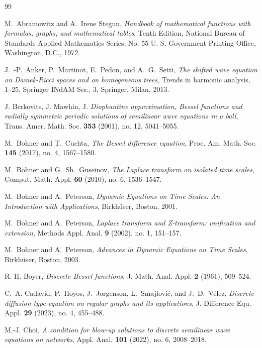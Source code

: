 \documentclass[12pt]{amsart}
\numberwithin{equation}{section}
\begin{document}
\begin{thebibliography}{99}

 M.~Abramowitz and A.~Irene Stegun, \emph{Handbook of
mathematical functions with formulas, graphs, and mathematical tables},
Tenth Edition, National Bureau of Standards Applied Mathematics Series, No.
55 U. S. Government Printing Office, Washington, D.C., 1972.

 J.~-P.~Anker, P.~Martinot, E.~Pedon, and A.~G.~Setti, \emph{%
The shifted wave equation on Damek-Ricci spaces and on homogeneous trees},
Trends in harmonic analysis, 1--25, Springer INdAM Ser., 3, Springer, Milan,
2013.

 J. Berkovits, J. Mawhin, J. \emph{Diophantine approximation, Bessel functions and radially symmetric periodic solutions of semilinear wave equations in a ball}, Trans. Amer. Math. Soc. \textbf{353} (2001), no. 12, 5041--5055.

 M.~Bohner and T.~Cuchta, \emph{The Bessel difference equation},
Proc. Am. Math. Soc. \textbf{145} (2017), no. 4, 1567--1580.


 M.~Bohner and G.~Sh.~Guseinov, \emph{The Laplace transform on
isolated time scales}, Comput. Math. Appl. \textbf{60} (2010), no. 6,
1536--1547.

 M.~Bohner and A.~Peterson, \emph{Dynamic Equations on Time
Scales: An Introduction with Applications}, Birkh\"{u}ser, Boston, 2001.

 M.~Bohner and A.~Peterson, \emph{Laplace transform and
Z-transform: unification and extension}, Methods Appl. Anal. \textbf{9}
(2002), no. 1, 151--157.

 M.~Bohner and A.~Peterson, \emph{Advances in Dynamic Equations
on Time Scales}, Birkh\"{u}ser, Boston, 2003.

 R. H. Boyer, \emph{Discrete Bessel functions}, J. Math.
Anal. Appl. \textbf{2} (1961), 509--524.

 C.~A. Cadavid, P.~Hoyos, J.~Jorgenson, L.~Smajlovi\'{c}, and
J.~D.~V\'{e}lez, \emph{Discrete diffusion-type equation on regular graphs
and its applications}, J. Difference Equ. Appl. \textbf{29} (2023), no. 4, 455--488.

 M.-J. Choi, \emph{A condition for blow-up solutions to discrete semilinear wave equations on networks}, Appl. Anal. \textbf{101} (2022), no. 6, 2008--2018.


\end{thebibliography}
\end{document}
